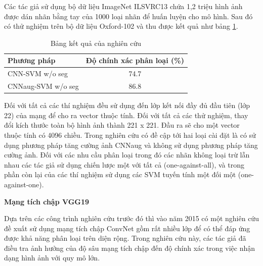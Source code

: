 \documentclass[12pt]{report}
\begin{document}
		Các tác giả sử dụng bộ dữ liệu ImageNet ILSVRC13 
		\cite{cia_ImageNet ILSVRC 2013} chứa 1,2 triệu hình ảnh được 
		dán nhãn bằng tay của 1000 loại nhãn để huấn luyện cho mô hình. 
		Sau đó có thử nghiệm trên bộ dữ liệu Oxford-102 \cite{cia-Nilsback06} và thu được kết quả như bảng \ref{tbl:table ket qua cua cnn_feature}.
																										
		\begin{table}[h]
			\centering
			\caption{Bảng kết quả của nghiên cứu \cite{cia-CNNFeatures off-the-shelf}}
			\label{tbl:table ket qua cua cnn_feature}
			\begin{tabular}{|l|c|}
				\hline
				\textbf{Phương pháp} & \textbf{Độ chính xác phân loại (\%)} \\ \hline
				CNN-SVM w/o seg         & 74.7                                         \\ \hline
				CNNaug-SVM w/o seg      & 86.8                                         \\ \hline
																																																																																												
			\end{tabular}
		\end{table}
																								
		Đối với tất cả các thí nghiệm đều sử dụng đến lớp kết nối đầy đủ đầu tiên (lớp 22) của mạng để cho ra vector thuộc tính. Đối với tất cả các thử nghiệm, thay đổi kích thước toàn bộ hình ảnh thành 221 x 221. Đầu ra sẽ cho một vector thuộc tính có 4096 chiều. Trong nghiên cứu có đề cập tới hai loại cài đặt là có sử dụng phương pháp tăng cường ảnh CNNaug và không sử dụng phương pháp tăng cường ảnh. Đối với các nhu cầu phân loại trong đó các nhãn không loại trừ lẫn nhau các tác giả sử dụng chiến lược một với tất cả (one-against-all), và trong phần còn lại của các thí nghiệm sử dụng các SVM tuyến tính một đối một (one-against-one).
																								
																								
		\textbf{Mạng tích chập VGG19 \cite{cia_vgg19}}
																										
		Dựa trên các công trình nghiên cứu trước đó thì vào năm 2015 có một nghiên cứu \cite{cia_vgg19} đề xuất sử dụng mạng tích chập ConvNet \cite{cia_vgg19} gồm rất nhiều lớp để có thể đáp ứng được khả năng phân loại trên diện rộng. Trong nghiên cứu này, các tác giả đã điều tra ảnh hưởng của độ sâu mạng tích chập đến độ chính xác trong việc nhận dạng hình ảnh với quy mô lớn.  
																										
\end{document}
